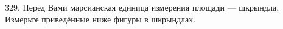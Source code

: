 329. Перед Вами марсианская единица измерения площади --- шкрындла. Измерьте приведённые ниже фигуры в
шкрындлах.\\
\begin{figure}[ht!]
\end{figure}\\
